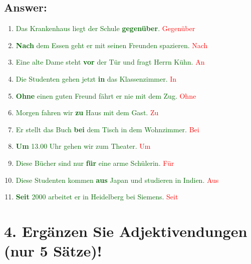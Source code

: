 \documentclass[12pt]{article}
\begin{document}
\subsection*{Answer:}
\begin{enumerate}
    \item \textcolor{darkgreen}{Das Krankenhaus liegt der Schule \textbf{gegenüber}.} \textcolor{red}{Gegenüber}
    \item \textcolor{darkgreen}{\textbf{Nach} dem Essen geht er mit seinen Freunden spazieren.} \textcolor{red}{Nach}
    \item \textcolor{darkgreen}{Eine alte Dame steht \textbf{vor} der Tür und fragt Herrn Kühn.} \textcolor{red}{An}
    \item \textcolor{darkgreen}{Die Studenten gehen jetzt \textbf{in} das Klassenzimmer.} \textcolor{red}{In}
    \item \textcolor{darkgreen}{\textbf{Ohne} einen guten Freund fährt er nie mit dem Zug.} \textcolor{red}{Ohne}
    \item \textcolor{darkgreen}{Morgen fahren wir \textbf{zu} Haus mit dem Gast.} \textcolor{red}{Zu}
    \item \textcolor{darkgreen}{Er stellt das Buch \textbf{bei} dem Tisch in dem Wohnzimmer.} \textcolor{red}{Bei}
    \item \textcolor{darkgreen}{\textbf{Um} 13.00 Uhr gehen wir zum Theater.} \textcolor{red}{Um}
    \item \textcolor{darkgreen}{Diese Bücher sind nur \textbf{für} eine arme Schülerin.} \textcolor{red}{Für}
    \item \textcolor{darkgreen}{Diese Studenten kommen \textbf{aus} Japan und studieren in Indien.} \textcolor{red}{Aus}
    \item \textcolor{darkgreen}{\textbf{Seit} 2000 arbeitet er in Heidelberg bei Siemens.} \textcolor{red}{Seit}
\end{enumerate}



\vspace{1em}

\section*{4. Ergänzen Sie Adjektivendungen (nur 5 Sätze)!}
\end{document}

